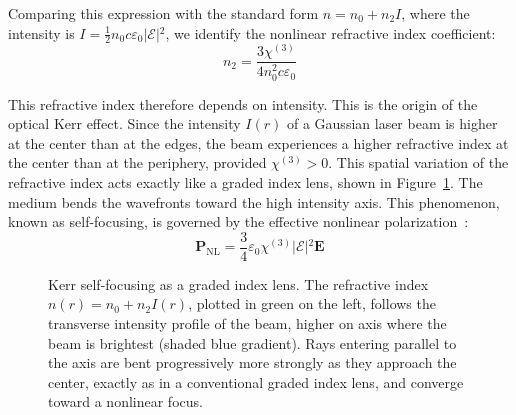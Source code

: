 Comparing this expression with the standard form $n = n_0 + n_2 I$, where the intensity is $I = \frac{1}{2}n_0 c \varepsilon_0 \vert{}\mathcal{E}\vert{}^2$, we identify the nonlinear refractive index coefficient:
\begin{equation}
n_2 = \frac{3\chi^{(3)}}{4n_0^2 c \varepsilon_0}
\end{equation}

This refractive index therefore depends on intensity. This is the origin of the optical Kerr effect. Since the intensity $I(r)$ of a Gaussian laser beam is higher at the center than at the edges, the beam experiences a higher refractive index at the center than at the periphery, provided $\chi^{(3)} > 0$. This spatial variation of the refractive index acts exactly like a graded index lens, shown in Figure~\ref{fig:kerr_lens}. The medium bends the wavefronts toward the high intensity axis. This phenomenon, known as self-focusing, is governed by the effective nonlinear polarization~\cite{mao2004}:
\begin{equation}
\mathbf{P}_{\text{NL}} = \frac{3}{4}\varepsilon_0 \chi^{(3)}\vert{}\mathcal{E}\vert{}^2 \mathbf{E}
\end{equation}

\begin{figure}[h!]
    \centering
    \caption{Kerr self-focusing as a graded index lens. The refractive index $n(r)=n_0+n_2I(r)$, plotted in green on the left, follows the transverse intensity profile of the beam, higher on axis where the beam is brightest (shaded blue gradient). Rays entering parallel to the axis are bent progressively more strongly as they approach the center, exactly as in a conventional graded index lens, and converge toward a nonlinear focus.}
    \label{fig:kerr_lens}
\end{figure}

